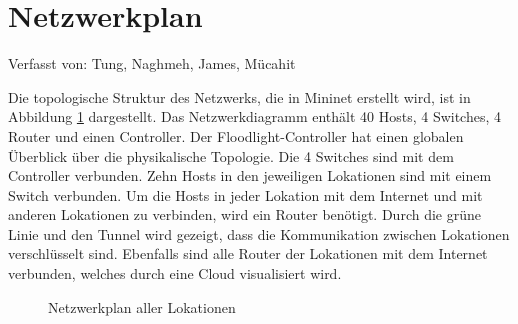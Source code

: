 \documentclass[fontsize=12pt,paper=a4,open=any,parskip=half,
  twoside=false,toc=listof,toc=bibliography,fleqn,leqno,
  captions=nooneline,captions=tableabove,british]{scrbook}
\begin{document}
\section{Netzwerkplan}
{\tiny Verfasst von: Tung, Naghmeh, James, Mücahit\par}
Die topologische Struktur des Netzwerks, die in Mininet erstellt wird, ist in Abbildung \ref{netzwerkplan} dargestellt. Das Netzwerkdiagramm enthält 40 Hosts, 4 Switches, 4 Router und einen Controller. Der Floodlight-Controller hat einen globalen Überblick über die physikalische Topologie. Die 4 Switches sind mit dem Controller verbunden. Zehn Hosts in den jeweiligen Lokationen sind mit einem Switch verbunden. Um die Hosts in jeder Lokation mit dem Internet und mit anderen Lokationen zu verbinden, wird ein Router benötigt. Durch die grüne Linie und den Tunnel wird gezeigt, dass die Kommunikation zwischen Lokationen verschlüsselt sind. Ebenfalls sind alle Router der Lokationen mit dem Internet verbunden, welches durch eine Cloud visualisiert wird.

\begin{figure}[H]
 \centering
 \captionsetup{justification=centering,margin=1cm}
 \caption{Netzwerkplan aller Lokationen}
 \label{netzwerkplan}
\end{figure}
\end{document}
